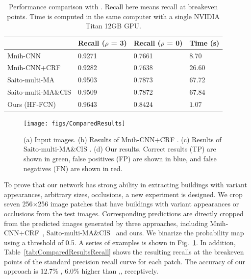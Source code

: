     \begin{table} 
    \centering
	\caption{Performance comparison with \cite{Mnih2013Machine,Saito2016Multiple}. Recall here  means recall at breakeven points. Time is computed in the same computer with a single NVIDIA Titan 12GB GPU.}
	\begin{tabular}{L{38mm}C{26mm}C{26mm}C{26mm}}     
	\toprule
	& Recall ($\rho$ = 3) & Recall ($\rho$ = 0)& Time (s)\\
	\midrule
	Mnih-CNN \cite{Mnih2013Machine} & 0.9271 & 0.7661 & 8.70  \\ 
	Mnih-CNN+CRF \cite{Mnih2013Machine} & 0.9282 & 0.7638 & 26.60\\ 
	Saito-multi-MA \cite{Saito2016Multiple} & 0.9503 & 0.7873 & 67.72 \\
	Saito-multi-MA$\&$CIS \cite{Saito2016Multiple} & 0.9509 & 0.7872 & 67.84 \\
	Ours (HF-FCN) & $\bm{0.9643}$ & $\bm{0.8424}$ & $\bm{1.07}$\\
	\bottomrule
	\end{tabular}
	\label{tab:PerformanceComparision}
	\end{table}  
 
 	 
\begin{figure}
\centering
\texttt{[image: figs/ComparedResults]}
\caption{(a) Input images. (b) Results of Mnih-CNN+CRF \cite{Mnih2013Machine}. (c) Results of Saito-multi-MA$\&$CIS \cite{Saito2016Multiple}. (d) Our results. 
Correct results (TP) are shown in green, false positives (FP) are shown in blue, and false negatives (FN) are shown in red.}
\label{fig:ComparedResults}
\end{figure} 
    
 
To prove that our network has strong ability in extracting buildings with variant appearances, arbitrary sizes, occlusions, a new experiment is designed.
% 
We crop seven 256$\times$256 image patches that have buildings with variant appearances or occlusions from the test images. 
Corresponding predictions are directly  cropped from the predicted images generated by three approaches, including Mnih-CNN+CRF~\cite{Mnih2013Machine}, Saito-multi-MA$\&$CIS~\cite{Saito2016Multiple} and ours. 
We binarize the probability map using a threshold of 0.5. A series of examples is shown in Fig.~\ref{fig:ComparedResults}.
%
In addition, Table~\ref{tab:ComparedResultsRecall} shows the resulting recalls at the breakeven points of the standard precision recall curve for each patch. The accuracy of our approach is 12.7\% , 6.0\% higher than \cite{Mnih2013Machine},\cite{Saito2016Multiple}, receptively.
 

